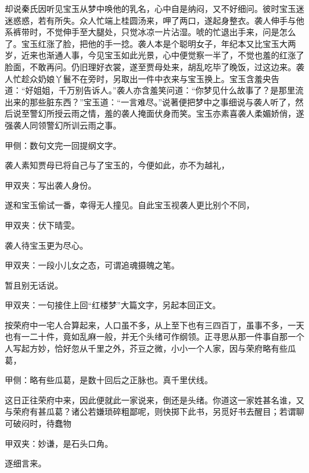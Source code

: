\begin{parag}
    却说秦氏因听见宝玉从梦中唤他的乳名，心中自是纳闷，又不好细问。彼时宝玉迷迷惑惑，若有所失。众人忙端上桂圆汤来，呷了两口，遂起身整衣。袭人伸手与他系裤带时，不觉伸手至大腿处，只觉冰凉一片沾湿。唬的忙退出手来，问是怎么了。宝玉红涨了脸，把他的手一捻。袭人本是个聪明女子，年纪本又比宝玉大两岁，近来也渐通人事，今见宝玉如此光景，心中便觉察一半了，不觉也羞的红涨了脸面，不敢再问。仍旧理好衣裳，遂至贾母处来，胡乱吃毕了晚饭，过这边来。袭人忙趁众奶娘丫鬟不在旁时，另取出一件中衣来与宝玉换上。宝玉含羞央告道：“好姐姐，千万别告诉人。”袭人亦含羞笑问道：“你梦见什么故事了？是那里流出来的那些脏东西？”宝玉道：“一言难尽。”说著便把梦中之事细说与袭人听了，然后说至警幻所授云雨之情，羞的袭人掩面伏身而笑。宝玉亦素喜袭人柔媚娇俏，遂强袭人同领警幻所训云雨之事。\begin{note}甲侧：数句文完一回提纲文字。\end{note}袭人素知贾母已将自己与了宝玉的，今便如此，亦不为越礼，\begin{note}甲双夹：写出袭人身份。\end{note}遂和宝玉偷试一番，幸得无人撞见。自此宝玉视袭人更比别个不同，\begin{note}甲双夹：伏下晴雯。\end{note}袭人待宝玉更为尽心。\begin{note}甲双夹：一段小儿女之态，可谓追魂摄魄之笔。\end{note}暂且别无话说。\begin{note}甲双夹：一句接住上回“红楼梦”大篇文字，另起本回正文。\end{note}
\end{parag}


\begin{parag}
    按荣府中一宅人合算起来，人口虽不多，从上至下也有三四百丁，虽事不多，一天也有一二十件，竟如乱麻一般，并无个头绪可作纲领。正寻思从那一件事自那一个人写起方妙，恰好忽从千里之外，芥豆之微，小小一个人家，因与荣府略有些瓜葛，\begin{note}甲侧：略有些瓜葛，是数十回后之正脉也。真千里伏线。 \end{note}这日正往荣府中来，因此便就此一家说来，倒还是头绪。你道这一家姓甚名谁，又与荣府有甚瓜葛？诸公若嫌琐碎粗鄙呢，则快掷下此书，另觅好书去醒目；若谓聊可破闷时，待蠢物\begin{note}甲双夹：妙谦，是石头口角。\end{note}逐细言来。
\end{parag}


